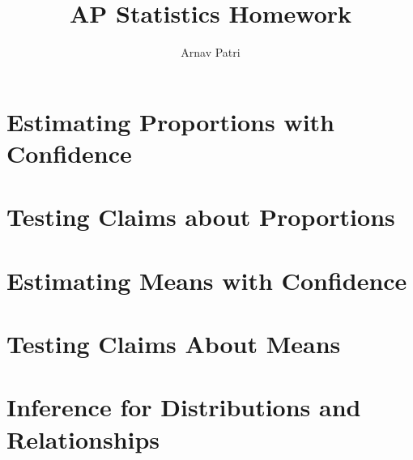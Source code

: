\documentclass[12pt, A4]{report}
\title{AP Statistics Homework}
\author{Arnav Patri}
\begin{document}
	\maketitle
	\tableofcontents
	\setcounter{chapter}{7}
	\chapter{Estimating Proportions with Confidence}
		
	\chapter{Testing Claims about Proportions}
		
	\chapter{Estimating Means with Confidence}
		
	\chapter{Testing Claims About Means}
		
	\chapter{Inference for Distributions and Relationships}
		
\end{document}
